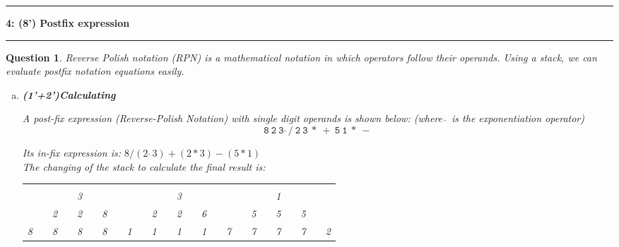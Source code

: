 \documentclass[10.5pt]{article}
\newcommand\question[2]{\vspace{.25in}\hrule\textbf{#1: #2}\vspace{.5em}
\hrule\vspace{.10in}}
\newtheorem{Q}{Question}
\begin{document}
	\question{4}{(8') Postfix expression}
	\begin{Q}
	Reverse Polish notation (RPN) is a mathematical notation in which operators follow their operands. Using a stack, we can evaluate postfix notation equations easily.
	
	\begin{enumerate}[(a)]
		\item \textbf{(1'+2')Calculating}
		
		A post-fix expression (Reverse-Polish Notation) with single digit operands is shown below: (where $\hat\ $ is the exponentiation operator)\\
		$$\mathtt{8\ 2\ 3\ \hat \ /\ 2\ 3\ *\ +\ 5\ 1\ *\ -}$$
		
		
		Its in-fix expression is: 
		$8 /(2 \ \hat\ 3)+ (2 * 3)- (5 * 1)$\\
		The changing of the stack to calculate the final result is:
		\begin{table}[htb]
			\centering\begin{tabular}{|l|l|l|l|l|l|l|l|l|l|l|l|l|l|l|l|l|l|l|l|l|l|l|l|l|}
				\cline{1-1} \cline{3-3} \cline{5-5} \cline{7-7} \cline{9-9} \cline{11-11} \cline{13-13} \cline{15-15} \cline{17-17} \cline{19-19} \cline{21-21} \cline{23-23} \cline{25-25}
				  &  &   &  &   &  &   &  &   &  &   &  &   &  &   &  &   &  &   &  &  &  &   &   &  \\ \cline{1-1} \cline{3-3} \cline{5-5} \cline{7-7} \cline{9-9} \cline{11-11} \cline{13-13} \cline{15-15} \cline{17-17} \cline{19-19} \cline{21-21} \cline{23-23} \cline{25-25}
				  &  &   &  & 3 &  &   &  &   &  &   &  & 3 &  &   &  &   &  &   &  &  1&  &   & &  \\ \cline{1-1} \cline{3-3} \cline{5-5} \cline{7-7} \cline{9-9} \cline{11-11} \cline{13-13} \cline{15-15} \cline{17-17} \cline{19-19} \cline{21-21} \cline{23-23} \cline{25-25}
				  &  & 2 &  & 2 &  & 8 &  &   &  & 2 &  & 2 &  & 6 &  &   &  & 5 &  &  5&  & 5 & &   \\ \cline{1-1} \cline{3-3} \cline{5-5} \cline{7-7} \cline{9-9} \cline{11-11} \cline{13-13} \cline{15-15} \cline{17-17} \cline{19-19} \cline{21-21} \cline{23-23} \cline{25-25}
				8 &  & 8 &  & 8 &  & 8 &  & 1 &  & 1 &  & 1 &  & 1 &  & 7 &  & 7 &  &  7&  & 7 & & 2 \\ \cline{1-1} \cline{3-3} \cline{5-5} \cline{7-7} \cline{9-9} \cline{11-11} \cline{13-13} \cline{15-15} \cline{17-17} \cline{19-19} \cline{21-21} \cline{23-23} \cline{25-25}
			\end{tabular}
		\end{table}


\end{enumerate}
\end{Q}
\end{document}
